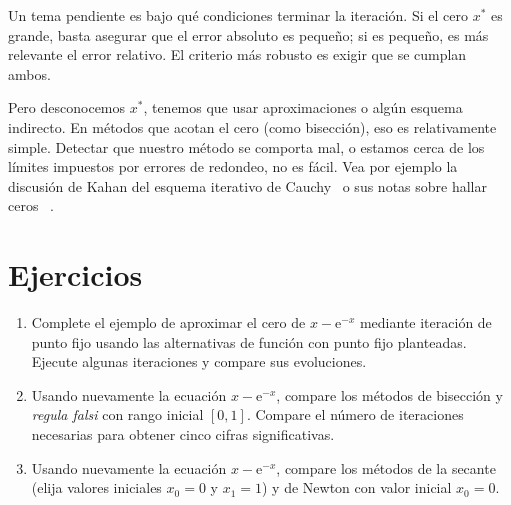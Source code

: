   Un tema pendiente es bajo qué condiciones terminar la iteración.
  Si el cero \(x^*\) es grande,
  basta asegurar que el error absoluto es pequeño;
  si es pequeño,
  es más relevante el error relativo.
  El criterio más robusto es exigir que se cumplan ambos.

  Pero desconocemos \(x^*\),
  tenemos que usar aproximaciones o algún esquema indirecto.
  En métodos que acotan el cero
  (como bisección),
  eso es relativamente simple.
  Detectar que nuestro método se comporta mal,
  o estamos cerca de los límites impuestos por errores de redondeo,
  no es fácil.
  Vea por ejemplo la discusión de Kahan del esquema iterativo de Cauchy~%
    \cite{kahan10:_estim_error_bound_cauchy_iteration}
  o sus notas sobre hallar ceros~%
    \cite{kahan16:_lecture_notes_real_root_finding}.

\section*{Ejercicios}
\label{sec:ejercicios-01}

  \begin{enumerate}
  \item
    Complete el ejemplo de aproximar el cero de \(x - \mathrm{e}^{-x}\)
    mediante iteración de punto fijo
    usando las alternativas de función con punto fijo planteadas.
    Ejecute algunas iteraciones y compare sus evoluciones.
  \item
    Usando nuevamente la ecuación \(x - \mathrm{e}^{-x}\),
    compare los métodos de bisección
    y \emph{\foreignlanguage{latin}{regula falsi}}
    con rango inicial \([0, 1]\).
    Compare el número de iteraciones necesarias
    para obtener cinco cifras significativas.
  \item
    Usando nuevamente la ecuación \(x - \mathrm{e}^{-x}\),
    compare los métodos de la secante
    (elija valores iniciales \(x_0 = 0\) y \(x_1 = 1\))
    y de Newton con valor inicial \(x_0 = 0\).
  \end{enumerate}




